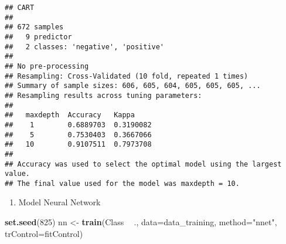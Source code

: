 \documentclass[]{article}
\newenvironment{Shaded}{\begin{snugshade}}{\end{snugshade}}
\newcommand{\DataTypeTok}[1]{\textcolor[rgb]{0.13,0.29,0.53}{#1}}
\newcommand{\DecValTok}[1]{\textcolor[rgb]{0.00,0.00,0.81}{#1}}
\newcommand{\KeywordTok}[1]{\textcolor[rgb]{0.13,0.29,0.53}{\textbf{#1}}}
\newcommand{\NormalTok}[1]{#1}
\newcommand{\OperatorTok}[1]{\textcolor[rgb]{0.81,0.36,0.00}{\textbf{#1}}}
\newcommand{\StringTok}[1]{\textcolor[rgb]{0.31,0.60,0.02}{#1}}
\providecommand{\tightlist}{%
  \setlength{\itemsep}{0pt}\setlength{\parskip}{0pt}}
\begin{document}
\begin{verbatim}
## CART 
## 
## 672 samples
##   9 predictor
##   2 classes: 'negative', 'positive' 
## 
## No pre-processing
## Resampling: Cross-Validated (10 fold, repeated 1 times) 
## Summary of sample sizes: 606, 605, 604, 605, 605, 605, ... 
## Resampling results across tuning parameters:
## 
##   maxdepth  Accuracy   Kappa    
##    1        0.6889703  0.3190082
##    5        0.7530403  0.3667066
##   10        0.9107511  0.7973708
## 
## Accuracy was used to select the optimal model using the largest value.
## The final value used for the model was maxdepth = 10.
\end{verbatim}

\begin{enumerate}
\def\labelenumi{\arabic{enumi}.}
\setcounter{enumi}{2}
\tightlist
\item
  Model Neural Network
\end{enumerate}

\begin{Shaded}
\begin{Highlighting}[]
\KeywordTok{set.seed}\NormalTok{(}\DecValTok{825}\NormalTok{)}
\NormalTok{nn <-}\StringTok{ }\KeywordTok{train}\NormalTok{(Class }\OperatorTok{~}\StringTok{ }\NormalTok{., }
            \DataTypeTok{data=}\NormalTok{data_training, }
            \DataTypeTok{method=}\StringTok{"nnet"}\NormalTok{,}
            \DataTypeTok{trControl=}\NormalTok{fitControl)}
\end{Highlighting}
\end{Shaded}
\end{document}
